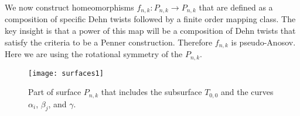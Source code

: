 
 We now construct homeomorphisms $f_{n,k}: P_{n,k} \to P_{n,k}$ that are defined as a composition of specific Dehn twists
followed by a finite order mapping class. The key insight is that a power of this map will be a composition of
Dehn twists that satisfy the criteria to be a Penner construction.  Therefore $f_{n,k}$ is pseudo-Anosov. Here we are using the rotational symmetry of the $P_{n,k}$.

\begin{figure}[t]
    \centering
    \texttt{[image: surfaces1]}
    \caption{Part of surface $P_{n,k}$ that includes the subsurface $T_{0,0}$ and the curves $\alpha_i$, $\beta_j$, and $\gamma$.}
    \label{fig:curves}
\end{figure}

